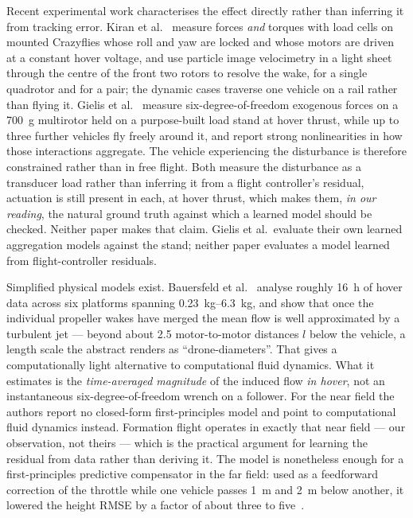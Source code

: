 Recent experimental work characterises the effect directly rather than inferring it from tracking
error. Kiran et al.~\cite{kiran2025downwash} measure forces \emph{and} torques with load cells on
mounted Crazyflies whose roll and yaw are locked and whose motors are driven at a constant hover
voltage, and use particle image velocimetry in a light sheet through the centre of the front two
rotors to resolve the wake, for
a single quadrotor and for a pair; the dynamic cases traverse one vehicle on a rail rather than
flying it. Gielis et al.~\cite{gielis2023aggregate} measure
six-degree-of-freedom exogenous forces on a \SI{700}{\gram} multirotor held on a purpose-built
load stand at hover
thrust, while up to three further vehicles fly freely around it, and report strong nonlinearities
in how those interactions aggregate. The vehicle experiencing the disturbance is therefore
constrained rather than in free flight. Both measure the disturbance as a transducer load rather
than inferring it from a flight controller's residual, actuation is still present in each, at
hover thrust, which makes them, \emph{in our reading}, the natural ground truth against which a
learned model should be checked. Neither paper makes that claim. Gielis et al.\ evaluate their own
learned aggregation models against the stand; neither paper evaluates a model learned from
flight-controller residuals.

Simplified physical models exist. Bauersfeld et al.~\cite{bauersfeld2024airflow} analyse roughly
\SI{16}{\hour} of hover data across six platforms spanning \SIrange{0.23}{6.3}{\kilo\gram}, and
show that once the individual propeller wakes have merged the mean flow is well approximated by a
turbulent jet --- beyond about \num{2.5} motor-to-motor distances $l$ below the vehicle, a length
scale the abstract renders as ``drone-diameters''. That gives a computationally light alternative
to computational fluid dynamics. What it estimates is the \emph{time-averaged magnitude} of the
induced flow \emph{in hover}, not an instantaneous six-degree-of-freedom wrench on a follower. For
the near field the authors report no closed-form first-principles model and point to computational
fluid dynamics instead. Formation flight operates in exactly that near field --- our observation,
not theirs --- which is the practical argument for learning the residual from data rather than
deriving it.
The model is nonetheless enough for a first-principles predictive compensator in the far field:
used as a feedforward correction of the throttle while one vehicle passes \SI{1}{\metre} and
\SI{2}{\metre} below another, it lowered the height RMSE by a factor of about three to
five~\cite{bauersfeld2024airflow}.

